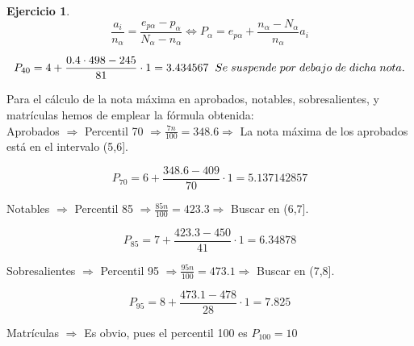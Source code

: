 \documentclass[a4paper, 12pt]{article}
\theoremstyle{definition}
\newtheorem{ej}{Ejercicio}
\begin{document}
\begin{ej}
\[
\frac{a_i}{n_\alpha} = \frac{e_{p\alpha} - p_\alpha}{N_\alpha - n_\alpha} \Longleftrightarrow P_\alpha = e_{p\alpha} + \frac{n_\alpha - N_\alpha}{n_\alpha}a_i
\]

\[
P_{40} = 4 + \frac{0.4 \cdot 498 -245}{81}\cdot 1 = 3.434567 \hspace{0.2cm} Se \hspace{0.1cm} suspende \hspace{0.1cm} por \hspace{0.1cm} debajo \hspace{0.1cm} de \hspace{0.1cm} dicha \hspace{0.1cm} nota.
\]

Para el cálculo de la nota máxima en aprobados, notables, sobresalientes, y matrículas hemos de emplear la fórmula obtenida: \\

Aprobados \(\Rightarrow\) Percentil 70 \(\Rightarrow \frac{7n}{100} = 348.6 \Rightarrow\) La nota máxima de los aprobados está en el intervalo (5,6].

\[
P_{70} = 6 + \frac{348.6 - 409}{70} \cdot 1 = 5.137142857
\]

Notables \(\Rightarrow\) Percentil 85 \(\Rightarrow \frac{85n}{100} = 423.3 \Rightarrow\) Buscar en (6,7].

\[
P_{85} = 7 + \frac{423.3 - 450}{41} \cdot 1 = 6.34878
\]

Sobresalientes \(\Rightarrow\) Percentil 95 \(\Rightarrow \frac{95n}{100} = 473.1 \Rightarrow\) Buscar en (7,8].

\[
P_{95} = 8 + \frac{473.1 - 478}{28} \cdot 1 = 7.825
\]

Matrículas \(\Rightarrow\) Es obvio, pues el percentil 100 es \(P_{100} = 10\)
\end{ej}
\end{document}
